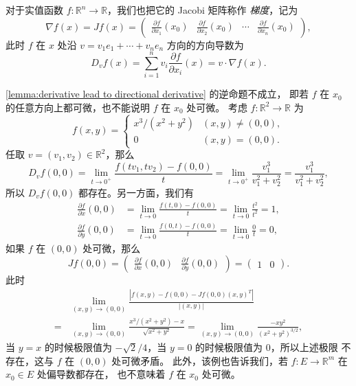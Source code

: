 \documentclass[fontset=none,zihao=-4]{Notes}
\newcommand{\abs}[1]{\left\lvert#1\right\rvert}
\begin{document}
对于实值函数 $f:\mathbb{R}^n\to\mathbb{R}$，我们也把它的 Jacobi 矩阵称作
\emph{梯度}，记为
\[
  \nabla f(x)=Jf(x)=\begin{pmatrix}
    \frac{\partial f}{\partial x_1}(x_0) &
    \frac{\partial f}{\partial x_2}(x_0) & \cdots &
    \frac{\partial f}{\partial x_n}(x_0)
  \end{pmatrix}  ,
\]
此时 $f$ 在 $x$ 处沿 $v=v_1e_1+\cdots+v_ne_n$ 方向的方向导数为 
\[
  D_vf(x)=\sum_{i=1}^n v_i\frac{\partial f}{\partial x_i}(x)=v\cdot\nabla f(x).
\]

\begin{example}
  \autoref{lemma:derivative lead to directional derivative} 的逆命题不成立，
  即若 $f$ 在 $x_0$ 的任意方向上都可微，也不能说明 $f$ 在 $x_0$ 处可微。
  考虑 $f:\mathbb{R}^2\to\mathbb{R}$ 为
  \[
    f(x,y)=\begin{cases}
      x^3/(x^2+y^2) & (x,y)\neq (0,0),\\
      0 & (x,y)=(0,0).
    \end{cases}  
  \]
  任取 $v=(v_1,v_2)\in\mathbb{R}^2$，那么
  \[
    D_vf(0,0)=\lim_{t\to 0^+}\frac{f(tv_1,tv_2)-f(0,0)}{t}=
    \lim_{t\to 0^+}\frac{v_1^3}{v_1^2+v_2^2}=\frac{v_1^3}{v_1^2+v_2^2},
  \]
  所以 $D_vf(0,0)$ 都存在。另一方面，我们有
  \begin{align*}
    \frac{\partial f}{\partial x}(0,0)&=\lim_{t\to 0}
    \frac{f(t,0)-f(0,0)}{t}=\lim_{t\to 0}\frac{t^2}{t^2}=1,\\
    \frac{\partial f}{\partial y}(0,0)&=\lim_{t\to 0}\frac{f(0,t)-f(0,0)}{t}
    =\lim_{t\to 0} \frac{0}{t}=0,
  \end{align*}
  如果 $f$ 在 $(0,0)$ 处可微，那么
  \[
    Jf(0,0)=\begin{pmatrix}
      \frac{\partial f}{\partial x}(0,0) & \frac{\partial f}{\partial y}(0,0)
    \end{pmatrix}=\begin{pmatrix}
      1 & 0
    \end{pmatrix}.
  \]
  此时
  \begin{align*}
    &\lim_{(x,y)\to(0,0)}\frac{\abs{f(x,y)-f(0,0)-Jf(0,0)(x,y)^T}}{\abs{(x,y)}}\\
    =&\lim_{(x,y)\to(0,0)}\frac{x^3/(x^2+y^2)-x}{\sqrt{x^2+y^2}}
    =\lim_{(x,y)\to(0,0)}\frac{-xy^2}{(x^2+y^2)^{3/2}},
  \end{align*}
  当 $y=x$ 的时候极限值为 $-\sqrt{2}/4$，当 $y=0$ 的时候极限值为 $0$，所以上述极限
  不存在，这与 $f$ 在 $(0,0)$ 处可微矛盾。
  此外，该例也告诉我们，若 $f:E\to\mathbb{R}^m$ 在 $x_0\in E$ 处偏导数都存在，
  也不意味着 $f$ 在 $x_0$ 处可微。
\end{example}
\end{document}
